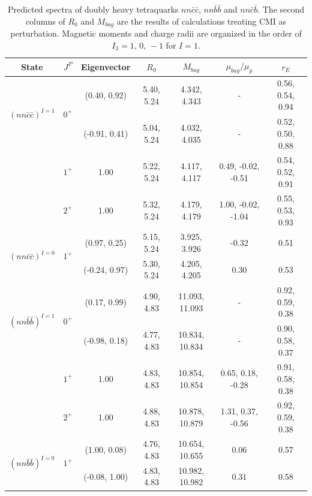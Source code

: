 \documentclass[prt,twocolumn,floatfix,nofootinbib]{revtex4}
\begin{document}
\renewcommand{\tabcolsep}{0.30cm}
\renewcommand{\arraystretch}{1.2}
\begin{table}[!htbp]
    \caption{Predicted spectra of doubly heavy tetraquarks $nn\bar{c}\bar{c}$, $nn\bar{b}\bar{b}$ and $nn\bar{c}\bar{b}$.
    The second columns of $R_{0}$ and $M_{bag}$ are the results of calculations treating CMI as perturbation.
    Magnetic moments and charge radii are organized in the order of $I_{3}=1,\,0,\,-1$ for $I=1$.}
    \label{tab:2heavytetraquark1}
    \begin{tabular}{ccccccc}
        \hline\hline
        {\rm State}     &$J^{P}$    &{\rm Eigenvector}      &$R_{0}$        &$M_{bag}$          &$\mu_{bag}/\mu_{p}$    &$r_{E}$ \\ \hline
        \multirow{2}{*}{${(nn\bar{c}\bar{c})}^{I=1}$}
                        &\multirow{2}{*}{$0^{+}$}
                                    &(0.40, 0.92)           &5.40, 5.24	    &4.342, 4.343	    &-                      &0.56, 0.54, 0.94 \\
                        &           &(-0.91, 0.41)          &5.04, 5.24	    &4.032, 4.035	    &-                      &0.52, 0.50, 0.88 \\
                        &$1^{+}$    &1.00                   &5.22, 5.24	    &4.117, 4.117	    &0.49, -0.02, -0.51     &0.54, 0.52, 0.91 \\
                        &$2^{+}$    &1.00                   &5.32, 5.24	    &4.179, 4.179	    &1.00, -0.02, -1.04     &0.55, 0.53, 0.93 \\
        \multirow{2}{*}{${(nn\bar{c}\bar{c})}^{I=0}$}
                        &\multirow{2}{*}{$1^{+}$}
                                    &(0.97, 0.25)           &5.15, 5.24	    &3.925, 3.926	    &-0.32                  &0.51 \\
                        &           &(-0.24, 0.97)          &5.30, 5.24	    &4.205, 4.205	    &0.30                   &0.53 \\
        \multirow{2}{*}{${(nn\bar{b}\bar{b})}^{I=1}$}
                        &\multirow{2}{*}{$0^{+}$}
                                    &(0.17, 0.99)           &4.90, 4.83	    &11.093, 11.093	    &-                      &0.92, 0.59, 0.38 \\
                        &           &(-0.98, 0.18)          &4.77, 4.83	    &10.834, 10.834	    &-                      &0.90, 0.58, 0.37 \\
                        &$1^{+}$    &1.00                   &4.83, 4.83	    &10.854, 10.854	    &0.65, 0.18, -0.28      &0.91, 0.58, 0.38 \\
                        &$2^{+}$    &1.00                   &4.88, 4.83	    &10.878, 10.879	    &1.31, 0.37, -0.56      &0.92, 0.59, 0.38 \\
        \multirow{2}{*}{${(nn\bar{b}\bar{b})}^{I=0}$}
                        &\multirow{2}{*}{$1^{+}$}
                                    &(1.00, 0.08)           &4.76, 4.83	    &10.654, 10.655	    &0.06                   &0.57 \\
                        &           &(-0.08, 1.00)          &4.83, 4.83	    &10.982, 10.982	    &0.31                   &0.58 \\


\end{tabular}
\end{table}
\end{document}
